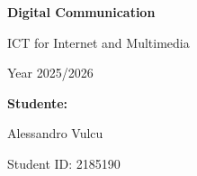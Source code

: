 \begin{titlepage}
    \raggedright
    \vspace*{1cm} %

    {\Huge\bfseries Digital Communication}\par %
    \vspace{0.5cm}
    {\LARGE ICT for Internet and Multimedia}\par %
    \vspace{0.2cm}
    {\large Year 2025/2026}\par %

    \vfill %

    \begin{flushright}
        {\Large \textbf{Studente:}}\par
        {\Large Alessandro Vulcu}\par
        {\large Student ID: 2185190}\par
    \end{flushright}

    \vspace{2cm} %


\end{titlepage}
